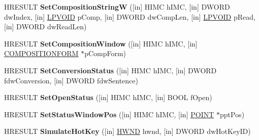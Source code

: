 \begin{DoxyCompactItemize}
\item 
\mbox{\label{interface_i_active_i_m_m_app_afbae190fc390d4ff93b16208fe9cbb57}} 
H\+R\+E\+S\+U\+LT {\bfseries Set\+Composition\+StringW} (\mbox{[}in\mbox{]} H\+I\+MC h\+I\+MC, \mbox{[}in\mbox{]} D\+W\+O\+RD dw\+Index, \mbox{[}in\mbox{]} \hyperlink{interfacevoid}{L\+P\+V\+O\+ID} p\+Comp, \mbox{[}in\mbox{]} D\+W\+O\+RD dw\+Comp\+Len, \mbox{[}in\mbox{]} \hyperlink{interfacevoid}{L\+P\+V\+O\+ID} p\+Read, \mbox{[}in\mbox{]} D\+W\+O\+RD dw\+Read\+Len)
\item 
\mbox{\label{interface_i_active_i_m_m_app_a24cd2caf2dfe0374017ebee99e9a115a}} 
H\+R\+E\+S\+U\+LT {\bfseries Set\+Composition\+Window} (\mbox{[}in\mbox{]} H\+I\+MC h\+I\+MC, \mbox{[}in\mbox{]} \hyperlink{struct_c_o_m_p_o_s_i_t_i_o_n_f_o_r_m}{C\+O\+M\+P\+O\+S\+I\+T\+I\+O\+N\+F\+O\+RM} $\ast$p\+Comp\+Form)
\item 
\mbox{\label{interface_i_active_i_m_m_app_ada847ae6dfe0e97a8e3cc3fe8db081d4}} 
H\+R\+E\+S\+U\+LT {\bfseries Set\+Conversion\+Status} (\mbox{[}in\mbox{]} H\+I\+MC h\+I\+MC, \mbox{[}in\mbox{]} D\+W\+O\+RD fdw\+Conversion, \mbox{[}in\mbox{]} D\+W\+O\+RD fdw\+Sentence)
\item 
\mbox{\label{interface_i_active_i_m_m_app_a61e1f73bf58fbe514a9cfd6b24b86c34}} 
H\+R\+E\+S\+U\+LT {\bfseries Set\+Open\+Status} (\mbox{[}in\mbox{]} H\+I\+MC h\+I\+MC, \mbox{[}in\mbox{]} B\+O\+OL f\+Open)
\item 
\mbox{\label{interface_i_active_i_m_m_app_ae6034538a887b6fc3e9fc698b3f00cd2}} 
H\+R\+E\+S\+U\+LT {\bfseries Set\+Status\+Window\+Pos} (\mbox{[}in\mbox{]} H\+I\+MC h\+I\+MC, \mbox{[}in\mbox{]} \hyperlink{structtag_p_o_i_n_t}{P\+O\+I\+NT} $\ast$ppt\+Pos)
\item 
\mbox{\label{interface_i_active_i_m_m_app_a059084849c79ac2af217f0dcb68d55d3}} 
H\+R\+E\+S\+U\+LT {\bfseries Simulate\+Hot\+Key} (\mbox{[}in\mbox{]} \hyperlink{interfacevoid}{H\+W\+ND} hwnd, \mbox{[}in\mbox{]} D\+W\+O\+RD dw\+Hot\+Key\+ID)
\item 
\mbox{\label{interface_i_active_i_m_m_app_a5befd544f2cbec320f4df7e945a30343}} 

\end{DoxyCompactItemize}
